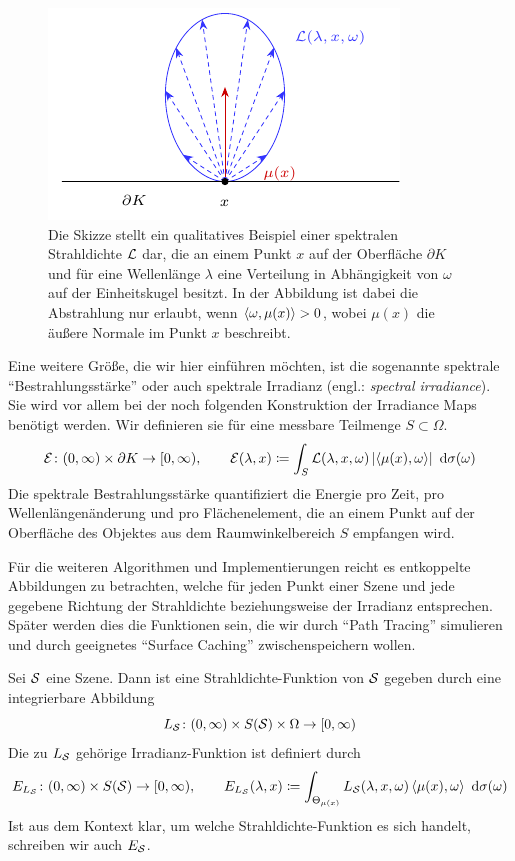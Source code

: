 		\begin{figure}[h]
			\center
			\includegraphics{gg_fig/radiance_1.pdf}
			\caption{Die Skizze stellt ein qualitatives Beispiel einer spektralen Strahldichte $\mathcal{L}$ dar, die an einem Punkt $x$ auf der Oberfläche $\partial K$ und für eine Wellenlänge $\lambda$ eine Verteilung in Abhängigkeit von $\omega$ auf der Einheitskugel besitzt. In der Abbildung ist dabei die Abstrahlung nur erlaubt, wenn $\left\langle \omega,\mu(x) \right\rangle>0$, wobei $\mu(x)$ die äußere Normale im Punkt $x$ beschreibt.}
			\label{fig:radiance}
		\end{figure}

		Eine weitere Größe, die wir hier einführen möchten, ist die sogenannte spektrale \enquote{Bestrahlungsstärke} oder auch spektrale Irradianz (engl.: \textit{spectral irradiance}).
		Sie wird vor allem bei der noch folgenden Konstruktion der Irradiance Maps benötigt werden.
		Wir definieren sie für eine messbare Teilmenge $S\subset\Omega$.
		\[
			\mathcal{E}\colon(0,\infty)\times\partial K\to[0,\infty),\qquad \mathcal{E}(\lambda,x) \coloneqq \int_{S}^{}  \mathcal{L}(\lambda,x,\omega)\left\vert \left\langle \mu(x),\omega \right\rangle \right\vert \ \mathrm{d} \sigma(\omega)
		\]
		Die spektrale Bestrahlungsstärke quantifiziert die Energie pro Zeit, pro Wellenlängenänderung und pro Flächenelement, die an einem Punkt auf der Oberfläche des Objektes aus dem Raumwinkelbereich $S$ empfangen wird.

		Für die weiteren Algorithmen und Implementierungen reicht es entkoppelte Abbildungen zu betrachten, welche für jeden Punkt einer Szene und jede gegebene Richtung der Strahldichte beziehungsweise der Irradianz entsprechen.
		Später werden dies die Funktionen sein, die wir durch \enquote{Path Tracing} simulieren und durch geeignetes \enquote{Surface Caching} zwischenspeichern wollen.
		\begin{definition}
			Sei $\mathcal{S}$ eine Szene.
			Dann ist eine Strahldichte-Funktion von $\mathcal{S}$ gegeben durch eine integrierbare Abbildung
			\[
				L_{\mathcal{S}}\colon(0,\infty)\times S(\mathcal{S})\times \Omega\to[0,\infty)
			\]
			Die zu $L_{\mathcal{S}}$ gehörige Irradianz-Funktion ist definiert durch
			\[
				E_{L_{\mathcal{S}}}\colon(0,\infty)\times S(\mathcal{S})\to[0,\infty),\qquad E_{L_{\mathcal{S}}}(\lambda, x) \coloneqq \int_{\Theta_{\mu(x)}}^{} L_{\mathcal{S}}(\lambda,x,\omega) \left\langle \mu(x),\omega \right\rangle\ \mathrm{d} \sigma(\omega)
			\]
			Ist aus dem Kontext klar, um welche Strahldichte-Funktion es sich handelt, schreiben wir auch $E_{\mathcal{S}}$.
		\end{definition}


